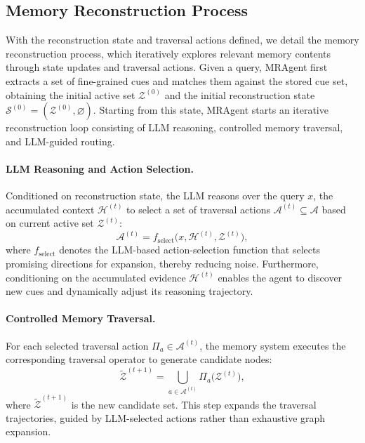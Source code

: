 \documentclass{llmxive}
\begin{document}
\subsection{Memory Reconstruction Process}
\label{subsec:active-reconstruction}
With the reconstruction state and traversal actions defined, we detail the memory reconstruction process, which iteratively explores relevant memory contents through state updates and traversal actions.
Given a query, MRAgent first extracts a set of fine-grained cues and matches them against the stored cue set, obtaining the initial active set $\mathcal{Z}^{(0)}$ and the initial reconstruction state
\(
\mathcal{S}^{(0)} = (\mathcal{Z}^{(0)}, \varnothing).
\)
Starting from this state, MRAgent starts an iterative reconstruction loop consisting of LLM reasoning, controlled memory traversal, and LLM-guided routing.

\paragraph{LLM Reasoning and Action Selection.}
Conditioned on reconstruction state, the LLM reasons over the query $x$, the accumulated context $ \mathcal{H}^{(t)}$ to select a set of traversal actions $\mathcal{A}^{(t)} \subseteq \mathcal{A}$ based on current active set $\mathcal{Z}^{(t)}$:
\begin{equation}
\mathcal{A}^{(t)} = f_{\text{select}}\!\big( x, \mathcal{H}^{(t)}, \mathcal{Z}^{(t)}\big),
\end{equation}
where $f_{\text{select}}$ denotes the LLM-based action-selection function that selects promising directions for expansion, thereby reducing noise.
Furthermore, conditioning on the accumulated evidence $\mathcal{H}^{(t)}$
enables the agent to discover new cues and dynamically adjust its reasoning
trajectory. 

\paragraph{Controlled Memory Traversal.}
For each selected traversal action $\Pi_a \in \mathcal{A}^{(t)}$, the memory system executes the corresponding traversal operator to generate candidate  nodes:
\begin{equation}
\widetilde{\mathcal{Z}}^{(t+1)} =
\bigcup_{a \in \mathcal{A}^{(t)}} \Pi_a\!\big(\mathcal{Z}^{(t)}\big),
\end{equation}
where $\widetilde{\mathcal{Z}}^{(t+1)}$ is the new candidate set. This step expands the traversal trajectories, guided by LLM-selected actions
rather than exhaustive graph expansion.
\end{document}
